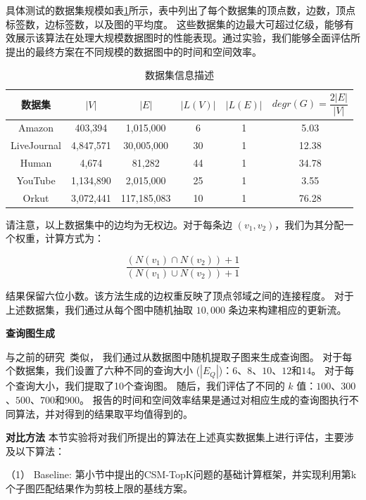 具体测试的数据集规模如表\ref{table:dataset}所示，表中列出了每个数据集的顶点数，边数，顶点标签数，边标签数，以及图的平均度。
这些数据集的边最大可超过亿级，能够有效展示该算法在处理大规模数据图时的性能表现。通过实验，我们能够全面评估所提出的最终方案在不同规模的数据图中的时间和空间效率。

\begin{table}[H]
    \centering
    \caption{数据集信息描述}
    \label{table:dataset}
    \begin{tabular}{cccccc}
        \toprule
        数据集   & $|V|$  & $|E|$ & $|L(V)|$ & $ |L(E)|$ & $degr(G)=\dfrac{2|E|}{|V|}$\\
        \midrule
        Amazon    & 403,394 & 1,015,000 & 6 & 1 & 5.03     \\ 
        LiveJournal   & 4,847,571 & 30,005,000 & 30 & 1 & 12.38 \\ 
        Human  & 4,674 & 81,282  & 44 & 1 & 34.78   \\ 
        YouTube  & 1,134,890 & 2,015,000 & 25 & 1 & 3.55  \\ 
        Orkut  & 3,072,441 & 117,185,083 & 10 & 1 & 76.28  \\ 
        \bottomrule
    \end{tabular}
\end{table}

请注意，以上数据集中的边均为无权边。对于每条边 $(v_1, v_2)$，我们为其分配一个权重，计算方式为：

\[
    \frac{(N(v_1) \cap N(v_2)) + 1}{(N(v_1) \cup N(v_2)) + 1}
\]


结果保留六位小数。该方法生成的边权重反映了顶点邻域之间的连接程度。
对于上述数据集，我们通过从每个图中随机抽取 $10,000$ 条边来构建相应的更新流。


\textbf{查询图生成}
\label{ss-sec:querygen}

与之前的研究~\cite{csm-turboflux-DBLP:conf/sigmod/KimSHLHCSJ18,csm-symbi-DBLP:journals/pvldb/MinPPGIH21,csm-survey:DBLP:journals/pvldb/SunSLH22}类似，
我们通过从数据图中随机提取子图来生成查询图。
对于每个数据集，我们设置了六种不同的查询大小 ($|E_Q|$)：$6$、$8$、$10$、$12$和$14$。
对于每个查询大小，我们提取了10个查询图。
随后，我们评估了不同的 $k$ 值：$100$、$300$、$500$、$700$和$900$。
报告的时间和空间效率结果是通过对相应生成的查询图执行不同算法，并对得到的结果取平均值得到的。

\textbf{对比方法}
本节实验将对我们所提出的算法在上述真实数据集上进行评估，主要涉及以下算法：

（1） Baseline: 第\label{ch3:base-framework}小节中提出的CSM-TopK问题的基础计算框架，并实现利用第k个子图匹配结果作为剪枝上限的基线方案。

